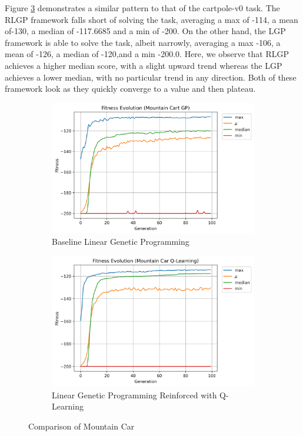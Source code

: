 \documentclass[12pt, final]{dalcsthesis}
\begin{document}
Figure \ref{fig:mountain-car-comparison} demonstrates a similar pattern to that of the cartpole-v0 task. The RLGP framework falls short of solving the task, averaging a max of -114, a mean of-130, a median of -117.6685 and a min of -200. On the other hand, the LGP framework is able to solve the task, albeit narrowly, averaging a max -106, a mean of -126, a median of -120,and a min -200.0. Here, we observe that RLGP achieves a higher median score, with a slight upward trend whereas the LGP achieves a lower median, with no particular trend in any direction. Both of these framework look as they quickly converge to a value and then plateau.

\begin{figure}[ht]
	\centering
	\begin{subfigure}{1.0\textwidth}
		\includegraphics[width=\linewidth]{mountain_car_lgp.png}
		\caption{Baseline Linear Genetic Programming}
		\label{fig:mountain-car-lgp}
	\end{subfigure}
	\hfill
	\begin{subfigure}{1.0\textwidth}
		\includegraphics[width=\linewidth]{mountain_car_q.png}
		\caption{Linear Genetic Programming Reinforced with Q-Learning}
		\label{fig:mountain-car-q}
	\end{subfigure}
	\caption{Comparison of Mountain Car}
	\label{fig:mountain-car-comparison}
\end{figure}
\end{document}

